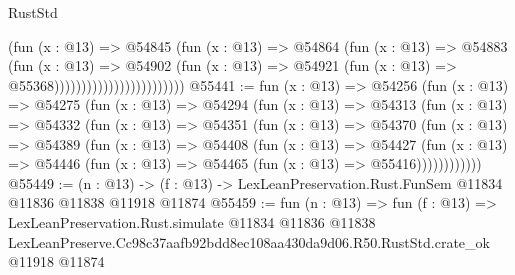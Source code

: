 \begin{lexlean}{RustStd}
\begin{coremodule}
                                        (fun (x : @13) =>
                                        @54845
                                          (fun (x : @13) =>
                                          @54864
                                            (fun (x : @13) =>
                                            @54883
                                              (fun (x : @13) =>
                                              @54902
                                                (fun (x : @13) =>
                                                @54921
                                                  (fun (x : @13) => @55368))))))))))))))))))))))))
@55441 := fun (x : @13) =>
  @54256
    (fun (x : @13) =>
    @54275
      (fun (x : @13) =>
      @54294
        (fun (x : @13) =>
        @54313
          (fun (x : @13) =>
          @54332
            (fun (x : @13) =>
            @54351
              (fun (x : @13) =>
              @54370
                (fun (x : @13) =>
                @54389
                  (fun (x : @13) =>
                  @54408
                    (fun (x : @13) =>
                    @54427
                      (fun (x : @13) =>
                      @54446 (fun (x : @13) => @54465 (fun (x : @13) => @55416))))))))))))
@55449 := (n : @13) ->
  (f : @13) -> LexLeanPreservation.Rust.FunSem @11834 @11836 @11838 @11918 @11874
@55459 := fun (n : @13) =>
  fun (f : @13) =>
  LexLeanPreservation.Rust.simulate
    @11834
    @11836
    @11838
    LexLeanPreserve.Cc98c37aafb92bdd8ec108aa430da9d06.R50.RustStd.crate_ok
    @11918
    @11874
\end{coremodule}
\end{lexlean}
